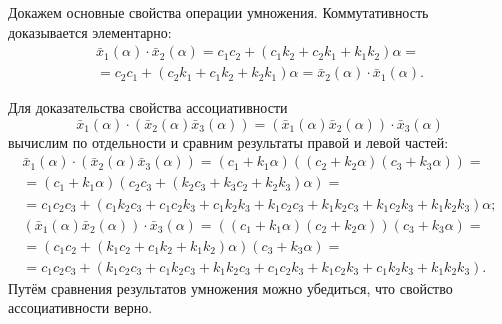 Докажем основные свойства операции умножения. Коммутативность доказывается элементарно:
\begin{gather*}
  \bar{x}_1(\alpha )\cdot \bar{x}_2(\alpha )=c_1 c_2+\left(c_1 k_2+c_2 k_1+k_1 k_2 \right)\alpha = {}\\ 
  {}=c_2 c_1+\left( c_2 k_1+c_1 k_2+k_2 k_1 \right)\alpha=\bar{x}_2(\alpha )\cdot \bar{x}_1(\alpha ).
\end{gather*}

Для доказательства свойства ассоциативности
\begin{equation*}
  \bar{x}_1\left( \alpha  \right)\cdot \left( \bar{x}_2\left( \alpha  \right)\bar{x}_3\left( \alpha \right) \right)=\left( \bar{x}_1\left( \alpha  \right)\bar{x}_2\left( \alpha \right) \right)\cdot \bar{x}_3\left( \alpha  \right)
\end{equation*}
вычислим по отдельности и сравним результаты правой и левой частей:
\begin{gather*}
\bar{x}_1\left( \alpha  \right)\cdot \left( \bar{x}_2\left( \alpha  \right)\bar{x}_3\left( \alpha  \right) \right)=\left( c_1+k_1\alpha  \right)\left( \left( c_2+k_2\alpha  \right)\left( c_3+k_3\alpha  \right) \right)={} \\ 
  {}=\left( c_1+k_1\alpha  \right)\left( c_2c_3+\left( k_2c_3+k_3c_2+k_2k_3 \right)\alpha  \right)={} \\ 
  {}=c_1c_2c_3+\left( c_1k_2c_3+c_1c_2k_3+c_1k_2k_3+k_1c_2c_3+k_1k_2c_3+k_1c_2k_3+k_1k_2k_3 \right)\alpha; \\
  \left( \bar{x}_1\left( \alpha  \right)\bar{x}_2\left( \alpha  \right) \right)\cdot \bar{x}_3\left( \alpha  \right)=\left( \left( c_1+k_1\alpha  \right)\left( c_2+k_2\alpha  \right) \right)\left( c_3+k_3\alpha  \right)={}\\ 
  {}=\left( c_1c_2+\left( k_1c_2+c_1k_2+k_1k_2 \right)\alpha  \right)\left( c_3+k_3\alpha  \right)={} \\ 
  {}=c_1c_2c_3+\left( k_1c_2c_3+c_1k_2c_3+k_1k_2c_3+c_1c_2k_3+k_1c_2k_3+c_1k_2k_3+k_1k_2k_3 \right). 
\end{gather*}
Путём сравнения результатов умножения можно убедиться, что свойство ассоциативности верно.

